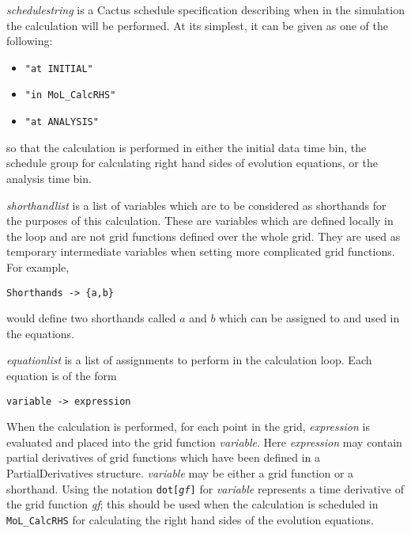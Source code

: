 \documentclass{report}
\begin{document}
{\it schedulestring} is a Cactus schedule specification describing
when in the simulation the calculation will be performed.  At its
simplest, it can be given as one of the following:
\begin{itemize}
\item {\tt "at INITIAL"}
\item {\tt "in MoL\_CalcRHS"}
\item {\tt "at ANALYSIS"}
\end{itemize}
so that the calculation is performed in either the initial data time
bin, the schedule group for calculating right hand sides of evolution
equations, or the analysis time bin.

{\it shorthandlist} is a list of variables which are to be considered as
shorthands for the purposes of this calculation.  These are variables
which are defined locally in the loop and are not grid functions
defined over the whole grid.  They are used as temporary intermediate
variables when setting more complicated grid functions. For example,
\begin{center}
\begin{minipage}{0.8 \textwidth}
\begin{verbatim}
Shorthands -> {a,b}
\end{verbatim}
\end{minipage}
\end{center}
would define two shorthands called $a$ and $b$ which can be assigned
to and used in the equations.

{\it equationlist} is a list of assignments to perform in the
calculation loop. Each equation is of the form
\begin{center}
\begin{minipage}{0.8 \textwidth}
\begin{verbatim}
variable -> expression
\end{verbatim}
\end{minipage}
\end{center}
When the calculation is performed, for each point in the grid, {\it
expression} is evaluated and placed into the grid function {\it
variable}.  Here {\it expression} may contain partial derivatives of
grid functions which have been defined in a PartialDerivatives
structure. {\it variable} may be either a grid function or a
shorthand.  Using the notation {\tt dot[{\it gf}]} for {\it variable}
represents a time derivative of the grid function {\it gf}; this
should be used when the calculation is scheduled in {\tt MoL\_CalcRHS}
for calculating the right hand sides of the evolution equations.
\end{document}
